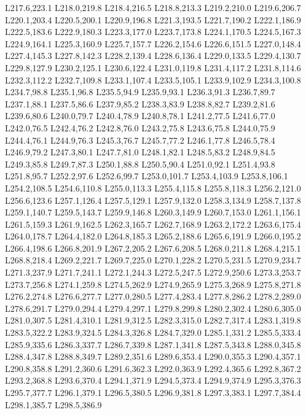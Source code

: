 		L217.6,223.1 L218.0,219.8 L218.4,216.5 L218.8,213.3 L219.2,210.0 L219.6,206.7 L220.1,203.4 L220.5,200.1
		L220.9,196.8 L221.3,193.5 L221.7,190.2 L222.1,186.9 L222.5,183.6 L222.9,180.3 L223.3,177.0 L223.7,173.8
		L224.1,170.5 L224.5,167.3 L224.9,164.1 L225.3,160.9 L225.7,157.7 L226.2,154.6 L226.6,151.5 L227.0,148.4
		L227.4,145.3 L227.8,142.3 L228.2,139.4 L228.6,136.4 L229.0,133.5 L229.4,130.7 L229.8,127.9 L230.2,125.1
		L230.6,122.4 L231.0,119.8 L231.4,117.2 L231.8,114.6 L232.3,112.2 L232.7,109.8 L233.1,107.4 L233.5,105.1
		L233.9,102.9 L234.3,100.8 L234.7,98.8 L235.1,96.8 L235.5,94.9 L235.9,93.1 L236.3,91.3 L236.7,89.7
		L237.1,88.1 L237.5,86.6 L237.9,85.2 L238.3,83.9 L238.8,82.7 L239.2,81.6 L239.6,80.6 L240.0,79.7
		L240.4,78.9 L240.8,78.1 L241.2,77.5 L241.6,77.0 L242.0,76.5 L242.4,76.2 L242.8,76.0 L243.2,75.8
		L243.6,75.8 L244.0,75.9 L244.4,76.1 L244.9,76.3 L245.3,76.7 L245.7,77.2 L246.1,77.8 L246.5,78.4
		L246.9,79.2 L247.3,80.1 L247.7,81.0 L248.1,82.1 L248.5,83.2 L248.9,84.5 L249.3,85.8 L249.7,87.3
		L250.1,88.8 L250.5,90.4 L251.0,92.1 L251.4,93.8 L251.8,95.7 L252.2,97.6 L252.6,99.7 L253.0,101.7
		L253.4,103.9 L253.8,106.1 L254.2,108.5 L254.6,110.8 L255.0,113.3 L255.4,115.8 L255.8,118.3 L256.2,121.0
		L256.6,123.6 L257.1,126.4 L257.5,129.1 L257.9,132.0 L258.3,134.9 L258.7,137.8 L259.1,140.7 L259.5,143.7
		L259.9,146.8 L260.3,149.9 L260.7,153.0 L261.1,156.1 L261.5,159.3 L261.9,162.5 L262.3,165.7 L262.7,168.9
		L263.2,172.2 L263.6,175.4 L264.0,178.7 L264.4,182.0 L264.8,185.3 L265.2,188.6 L265.6,191.9 L266.0,195.2
		L266.4,198.6 L266.8,201.9 L267.2,205.2 L267.6,208.5 L268.0,211.8 L268.4,215.1 L268.8,218.4 L269.2,221.7
		L269.7,225.0 L270.1,228.2 L270.5,231.5 L270.9,234.7 L271.3,237.9 L271.7,241.1 L272.1,244.3 L272.5,247.5
		L272.9,250.6 L273.3,253.7 L273.7,256.8 L274.1,259.8 L274.5,262.9 L274.9,265.9 L275.3,268.9 L275.8,271.8
		L276.2,274.8 L276.6,277.7 L277.0,280.5 L277.4,283.4 L277.8,286.2 L278.2,289.0 L278.6,291.7 L279.0,294.4
		L279.4,297.1 L279.8,299.8 L280.2,302.4 L280.6,305.0 L281.0,307.5 L281.4,310.1 L281.9,312.5 L282.3,315.0
		L282.7,317.4 L283.1,319.8 L283.5,322.2 L283.9,324.5 L284.3,326.8 L284.7,329.0 L285.1,331.2 L285.5,333.4
		L285.9,335.6 L286.3,337.7 L286.7,339.8 L287.1,341.8 L287.5,343.8 L288.0,345.8 L288.4,347.8 L288.8,349.7
		L289.2,351.6 L289.6,353.4 L290.0,355.3 L290.4,357.1 L290.8,358.8 L291.2,360.6 L291.6,362.3 L292.0,363.9
		L292.4,365.6 L292.8,367.2 L293.2,368.8 L293.6,370.4 L294.1,371.9 L294.5,373.4 L294.9,374.9 L295.3,376.3
		L295.7,377.7 L296.1,379.1 L296.5,380.5 L296.9,381.8 L297.3,383.1 L297.7,384.4 L298.1,385.7 L298.5,386.9
